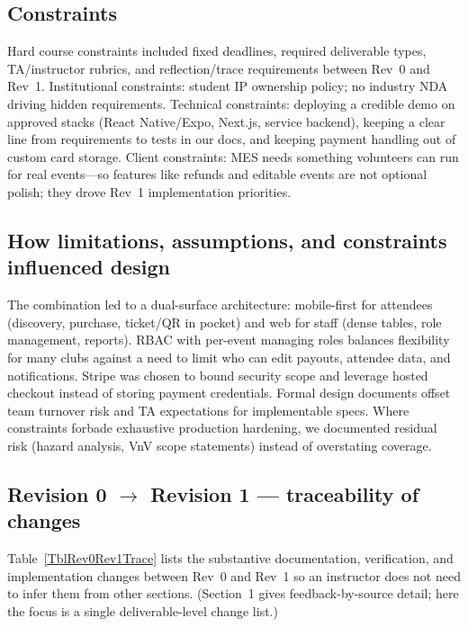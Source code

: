\documentclass{article}
\begin{document}
\subsection{Constraints}

Hard course constraints included fixed deadlines, required deliverable
types, TA/instructor rubrics, and reflection/trace requirements between Rev~0 and
Rev~1. Institutional constraints: student IP ownership policy; no
industry NDA driving hidden requirements. Technical constraints:
deploying a credible demo on approved stacks (React Native/Expo, Next.js,
service backend), keeping a clear line from requirements to tests in our docs, and
keeping payment handling out of custom card storage. Client constraints:
MES needs something volunteers can run for real events---so features like
refunds and editable events are not optional polish; they drove Rev~1
implementation priorities.

\subsection{How limitations, assumptions, and constraints influenced design}

The combination led to a dual-surface architecture: mobile-first for
attendees (discovery, purchase, ticket/QR in pocket) and web for staff (dense
tables, role management, reports). RBAC with per-event managing roles
balances flexibility for many clubs against a need to limit who can edit payouts,
attendee data, and notifications. Stripe was chosen to bound security
scope and leverage hosted checkout instead of storing payment credentials.
Formal design documents offset team turnover risk and TA expectations for
implementable specs. Where constraints forbade exhaustive production hardening,
we documented residual risk (hazard analysis, VnV scope statements)
instead of overstating coverage.

\subsection{Revision 0 $\rightarrow$ Revision 1 --- traceability of changes}

Table~\ref{TblRev0Rev1Trace} lists the substantive documentation,
verification, and implementation changes between Rev~0 and Rev~1 so an instructor
does not need to infer them from other sections. (Section~1 gives
feedback-by-source detail; here the focus is a single deliverable-level
change list.)
\end{document}
